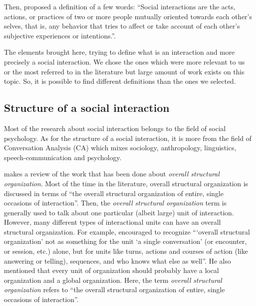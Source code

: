 \documentclass[a4paper,11pt,twoside]{StyleThese}
\begin{document}
Then, \cite{rummel_1976_understanding} proposed a definition of a few words: ``Social interactions are the acts, actions, or practices of two or more people mutually oriented towards each other's selves, that is, any behavior that tries to affect or take account of each other's subjective experiences or intentions.''.

The elements brought here, trying to define what is an interaction and more precisely a social interaction. We chose the ones which were more relevant to us or the most referred to in the literature but large amount of work exists on this topic. So, it is possible to find different definitions than the ones we selected.

\subsection{Structure of a social interaction}\label{chap1:subsec:social_int}
Most of the research about social interaction belongs to the field of social psychology. As for the structure of a social interaction, it is more from the field of Conversation Analysis (CA) which mixes sociology, anthropology, linguistics, speech-communication and psychology.

\cite{robinson_overall_2012} makes a review of the work that has been done about \emph{overall structural organization}. Most of the time in the literature, overall structural organization is discussed in terms of ``the overall structural organization of entire, single occasions of interaction''. Then, the \emph{overall structural organization} term is generally used to talk about one particular (albeit large) unit of interaction. However, many different types of interactional units can have an overall structural organization. For example, \cite{schegloff_2011_word} encouraged to recognize ``‘overall structural organization’ not as something for the unit ‘a single conversation’ (or encounter, or session, etc.) alone, but for units like turns, actions and courses of action (like answering or telling), sequences, and who knows what else as well''. He also mentioned that every unit of organization should probably have a local organization and a global organization. Here, the term \emph{overall structural organization} refers to ``the overall structural organization of entire, single occasions of interaction''. 
\end{document}
